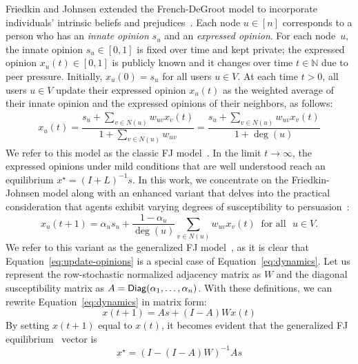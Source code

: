 Friedkin and Johnsen extended the French-DeGroot model to incorporate individuals' intrinsic beliefs and prejudices~\cite{friedkin1990social}. 
Each node $u\in [n]$ corresponds to a person who has
an \emph{innate opinion} $s_u$ and an \emph{expressed opinion}.
For each node~$u$, the innate opinion $s_u\in[0,1]$ is fixed over time and kept
private; the expressed opinion $x_u(t) \in[0,1]$ is publicly known 
and it changes over time $t\in\mathbb{N}$ due to peer pressure. 
Initially, $x_u(0)=s_u$ for all users $u\in V$. 
At each time
$t>0$, all users $u\in V$ update their expressed opinion $x_u(t)$ as the
weighted average of their innate opinion and the expressed opinions of their
neighbors, as 
follows:
\begin{align}
\label{eq:update-opinions}
	x_u(t) \!
	=\! \dfrac{s_u + \sum_{v\in N(u)} w_{uv} x_v(t)}{1 + \sum_{v\in N(u)} w_{uv}} \! =\! \dfrac{s_u + \sum_{v\in N(u)} w_{uv} x_v(t)}{1 + \deg(u)}
\end{align}
% 
We refer to this model as  the classic FJ model~\cite{friedkin1990social}. In the limit $t\to \infty$, the expressed opinions under mild conditions that are well understood reach an equilibrium $x^\star=(I+L)^{-1}s$.
In this work, we concentrate on the Friedkin-Johnsen model along with an enhanced variant that  delves into the practical consideration  that agents  exhibit varying degrees of susceptibility to persuasion~\cite{cialdini2001science}:
%
%
\begin{equation}
\label{eq:dynamics}
\boxed{\textstyle x_u(t+1) = \alpha_u s_u + \frac{1-\alpha_u}{\deg(u)} \sum_{v \in N(u)}  w_{uv} x_v(t) \ \text{~for all~~}u \in V.}
\end{equation}
% 
%
We refer to this variant as the generalized FJ model~\cite{abebe2020opinion,ghaderi2013opinion,bindel2015bad}, as it is clear that Equation~\eqref{eq:update-opinions} is a special case of Equation~\eqref{eq:dynamics}.  Let us represent the row-stochastic normalized adjacency matrix as \( W \) and the diagonal susceptibility matrix as \( A = {\sf Diag}(\alpha_1, \ldots, \alpha_n) \). With these definitions, we can rewrite Equation~\eqref{eq:dynamics} in  matrix form:
%
\begin{equation}
\label{eq:fj}
x(t+1) = A s + (I-A) W x(t) 
\end{equation}
%
%
By setting $x(t+1)$ equal to $x(t)$, it becomes evident that the generalized FJ equilibrium~\cite{abebe2020opinion,ghaderi2013opinion,bindel2015bad} vector is
%
%
\begin{equation}
\label{eq:fj2}
\boxed{x^\star = (I - (I-A) W)^{-1}As} 
\end{equation}
